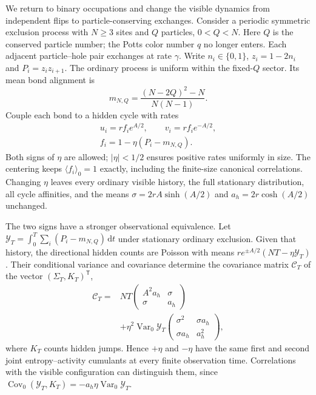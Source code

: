 \documentclass[aps,pre,reprint,amsmath,amssymb,longbibliography,floatfix]{revtex4-2}
\newcommand{\dd}{\,\mathrm d}
\newcommand{\Var}{\operatorname{Var}}
\begin{document}
We return to binary occupations and change the visible dynamics from
independent flips to particle-conserving exchanges. Consider a periodic
symmetric exclusion process with $N\geq3$ sites and $Q$ particles,
$0<Q<N$. Here $Q$ is the conserved particle number; the Potts color
number $q$ no longer enters. Each adjacent
particle--hole pair exchanges at rate $\gamma$. Write $n_i\in\{0,1\}$,
$z_i=1-2n_i$ and $P_i=z_i z_{i+1}$. The ordinary process is uniform within
the fixed-$Q$ sector. Its mean bond alignment is
\begin{equation}
 m_{N,Q}=\frac{(N-2Q)^2-N}{N(N-1)}.
 \label{eq:conserved-centering}
\end{equation}
Couple each bond to a hidden cycle with rates
\begin{equation}
 \begin{gathered}
 u_i=r f_i e^{A/2},\qquad v_i=r f_i e^{-A/2},\\
 f_i=1-\eta(P_i-m_{N,Q}).
 \end{gathered}
 \label{eq:conserved-rates}
\end{equation}
Both signs of $\eta$ are allowed; $|\eta|<1/2$ ensures positive rates
uniformly in size. The centering keeps $\langle f_i\rangle_0=1$ exactly,
including the finite-size canonical correlations. Changing $\eta$ leaves
every ordinary visible history, the full stationary distribution, all
cycle affinities, and the means $\sigma=2rA\sinh(A/2)$ and
$a_h=2r\cosh(A/2)$ unchanged.

The two signs have a stronger observational equivalence. Let
$\mathcal Y_T=\int_0^T\sum_i(P_i-m_{N,Q})\dd t$ under stationary ordinary
exclusion. Given that history, the directional hidden counts are Poisson
with means $r e^{\pm A/2}(NT-\eta\mathcal Y_T)$. Their conditional
variance and covariance determine the covariance matrix $\mathcal C_T$ of the vector $(\Sigma_T,K_T)^{\mathsf T}$,
\begin{equation}
 \begin{aligned}
 \mathcal C_T={}&NT\begin{pmatrix}A^2a_h&\sigma\\\sigma&a_h\end{pmatrix}\\
 &+\eta^2\Var_0\mathcal Y_T
 \begin{pmatrix}\sigma^2&\sigma a_h\\\sigma a_h&a_h^2\end{pmatrix},
 \end{aligned}
 \label{eq:conserved-matched-noise}
\end{equation}
where $K_T$ counts hidden jumps. Hence $+\eta$ and $-\eta$ have the same
first and second joint entropy--activity cumulants at every finite
observation time. Correlations with the visible configuration can
distinguish them, since
$\operatorname{Cov}_0(\mathcal Y_T,K_T)
=-a_h\eta\operatorname{Var}_0\mathcal Y_T$.
\end{document}

